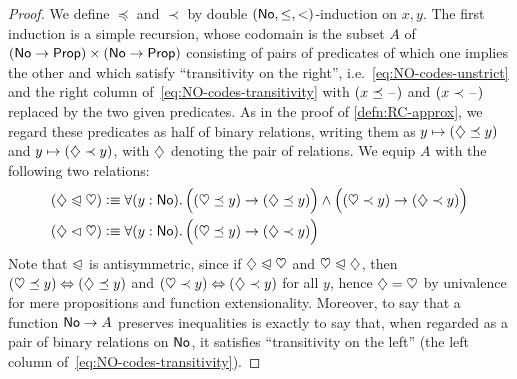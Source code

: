 \begin{proof}
  We define $\preceq$ and $\prec$ by double $(\mathsf{No},\le,<)$-induction on $x,y$.
  The first induction is a simple recursion, whose codomain is the subset $A$ of $(\mathsf{No}\to\mathsf{Prop})\times (\mathsf{No}\to\mathsf{Prop})$ consisting of pairs of predicates of which one implies the other and which satisfy ``transitivity on the right'', i.e.~\eqref{eq:NO-codes-unstrict} and the right column of~\eqref{eq:NO-codes-transitivity} with $(x\preceq \mathord{\hspace{1pt}\text{--}\hspace{1pt}})$ and $(x\prec \mathord{\hspace{1pt}\text{--}\hspace{1pt}})$ replaced by the two given predicates.
  As in the proof of \autoref{defn:RC-approx}, we regard these predicates as half of binary relations, writing them as $y\mapsto (\diamondsuit\preceq y)$ and $y\mapsto (\diamondsuit\prec y)$, with $\diamondsuit$ denoting the pair of relations.
  We equip $A$ with the following two relations:
  \begin{align*}
    (\hlname \ble \hlbname) &\defeq
    \fall{y:\NO} \Big( (\hleb y) \to (\hle y) \Big) \land
    \Big( (\hltb y) \to (\hlt y) \Big)\\
    (\hlname \blt \hlbname) &\defeq
    \fall{y:\NO} \Big( (\hleb y) \to (\hlt y) \Big)
  \end{align*}
  Note that $\trianglelefteqslant$ is antisymmetric, since if $\diamondsuit \trianglelefteqslant \heartsuit$ and $\heartsuit \trianglelefteqslant \diamondsuit$, then $(\heartsuit\preceq y) \Leftrightarrow (\diamondsuit\preceq y)$ and $(\heartsuit\prec y) \Leftrightarrow (\diamondsuit\prec y)$ for all $y$, hence $\diamondsuit=\heartsuit$ by univalence for mere propositions and function extensionality.
  Moreover, to say that a function $\mathsf{No}\to A$ preserves inequalities is exactly to say that, when regarded as a pair of binary relations on $\mathsf{No}$, it satisfies ``transitivity on the left'' (the left column of~\eqref{eq:NO-codes-transitivity}).


\end{proof}
